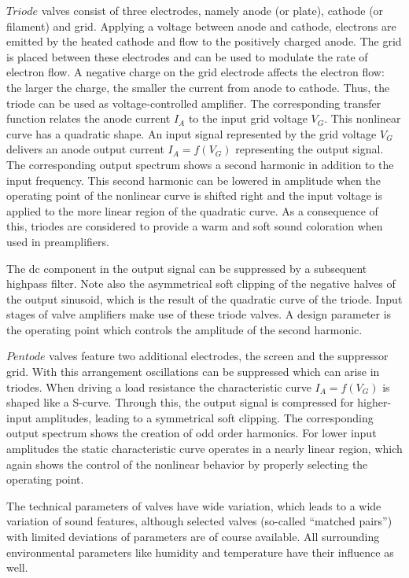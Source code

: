 \documentclass[10pt,a4paper,oneside]{article}
\begin{document}
$Triode$ valves consist of three electrodes, namely anode (or plate), cathode (or filament) and grid. Applying a voltage between anode and cathode, electrons are emitted by the heated cathode and flow to the positively charged anode. The grid is placed between these electrodes and can be used to modulate the rate of electron flow. A negative charge on the grid electrode affects the electron flow: the larger the charge, the smaller the current from anode to cathode. Thus, the triode can be used as voltage-controlled amplifier. The corresponding transfer function relates the anode current $I_A$ to the input grid voltage $V_G$. This nonlinear curve has a quadratic shape. An input signal represented by the grid voltage $V_G$ delivers an anode output current $I_A =f(V_G)$ representing the output signal. The corresponding output spectrum shows a second harmonic in addition to the input frequency. This second harmonic can be lowered in amplitude when the operating point of the nonlinear curve is shifted right and the input voltage is applied to the more linear region of the quadratic curve. As a consequence of this, triodes are considered to provide a warm and soft sound coloration when used in preamplifiers.

The dc component in the output signal can be suppressed by a subsequent highpass filter. Note also the asymmetrical soft clipping of the negative halves of the output sinusoid, which is the result of the quadratic curve of the triode. Input stages of valve amplifiers make use of these triode valves. A design parameter is the operating point which controls the amplitude of the second harmonic.

$Pentode$ valves feature two additional electrodes, the screen and the suppressor grid. With this arrangement oscillations can be suppressed which can arise in triodes. When driving a load resistance the characteristic curve $I_A = f (V_G)$ is shaped like a S-curve. Through this, the output signal is compressed for higher-input amplitudes, leading to a symmetrical soft clipping. The corresponding output spectrum shows the creation of odd order harmonics. For lower input amplitudes the static characteristic curve operates in a nearly linear region, which again shows the control of the nonlinear behavior by properly selecting the operating point.

The technical parameters of valves have wide variation, which leads to a wide variation of sound features, although selected valves (so-called “matched pairs”) with limited deviations of parameters are of course available. All surrounding environmental parameters like humidity and temperature have their influence as well.
\end{document}
